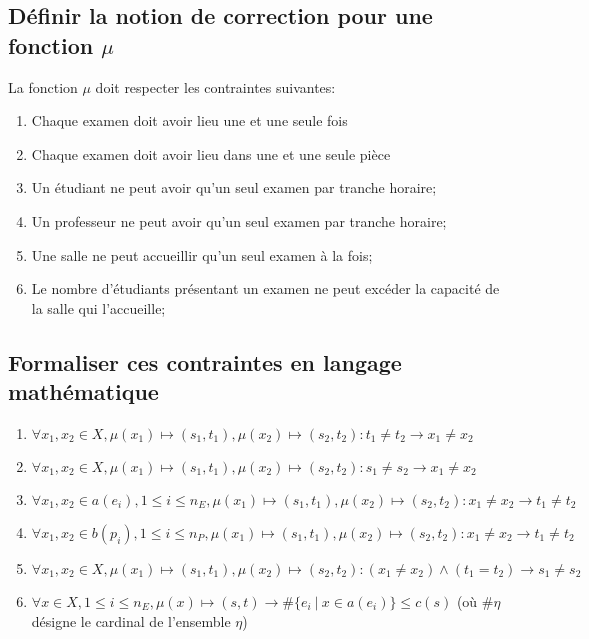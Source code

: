 \documentclass[a4paper]{article}
\begin{document}
\subsection{Définir la notion de correction pour une fonction $\mu$}
La fonction $\mu$ doit respecter les contraintes suivantes:
\begin{enumerate}
  \item Chaque examen doit avoir lieu une et une seule fois
  \item Chaque examen doit avoir lieu dans une et une seule pièce
  \item Un étudiant ne peut avoir qu'un seul examen par tranche horaire;
  \item Un professeur ne peut avoir qu'un seul examen par tranche horaire;
  \item Une salle ne peut accueillir qu'un seul examen à la fois;
  \item Le nombre d'étudiants présentant un examen ne peut excéder la capacité de la salle qui l'accueille;
\end{enumerate}

\subsection{Formaliser ces contraintes en langage mathématique}
\begin{enumerate}
  \item $\forall x_1,x_2 \in X, \mu(x_1) \mapsto (s_1,t_1), \mu(x_2) \mapsto (s_2,t_2): t_1 \neq t_2 \rightarrow x_1 \neq x_2 $
  \item $\forall x_1,x_2 \in X, \mu(x_1) \mapsto (s_1,t_1), \mu(x_2) \mapsto (s_2,t_2): s_1 \neq s_2 \rightarrow x_1 \neq x_2 $
  \item $\forall x_1,x_2 \in a(e_i), 1 \le i \le n_E, \mu(x_1) \mapsto (s_1,t_1), \mu(x_2) \mapsto (s_2,t_2): x_1 \neq x_2 \rightarrow t_1 \neq t_2 $
  \item $\forall x_1,x_2 \in b(p_i), 1 \le i \le n_P, \mu(x_1) \mapsto (s_1,t_1), \mu(x_2) \mapsto (s_2,t_2): x_1 \neq x_2 \rightarrow t_1 \neq t_2 $
  \item $\forall x_1,x_2 \in X, \mu(x_1) \mapsto (s_1,t_1), \mu(x_2) \mapsto (s_2,t_2): (x_1 \neq x_2) \land (t_1 = t_2) \rightarrow s_1 \neq s_2 $
  \item $\forall x \in X, 1 \le i \le n_E, \mu(x) \mapsto (s,t) \rightarrow \#\{e_i\ |\ x \in a(e_i)\} \le c(s)$ (où $\#\eta$ désigne le cardinal de l'ensemble $\eta$)
\end{enumerate}
\end{document}
